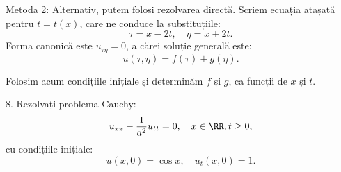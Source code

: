 Metoda 2: Alternativ, putem folosi rezolvarea directă. Scriem ecuația
atașată pentru $ t = t(x) $, care ne conduce la substituțiile:
\[
    \tau = x - 2t, \quad \eta = x + 2t.
\]
Forma canonică este $ u_{\tau\eta} = 0 $, a cărei soluție generală
este:
\[
    u(\tau, \eta) = f(\tau) + g(\eta).
\]

Folosim acum condițiile inițiale și determinăm $ f $ și $ g $, ca funcții
de $ x $ și $ t $.

\vspace{0.3cm}

8. Rezolvați problema Cauchy:
\[
    u_{xx} - \dfrac{1}{a^2} u_{tt} = 0, \quad x \in \RR, t \geq 0,
\]
cu condițiile inițiale:
\[
    u(x, 0) = \cos x, \quad u_t(x, 0) = 1.
\]
